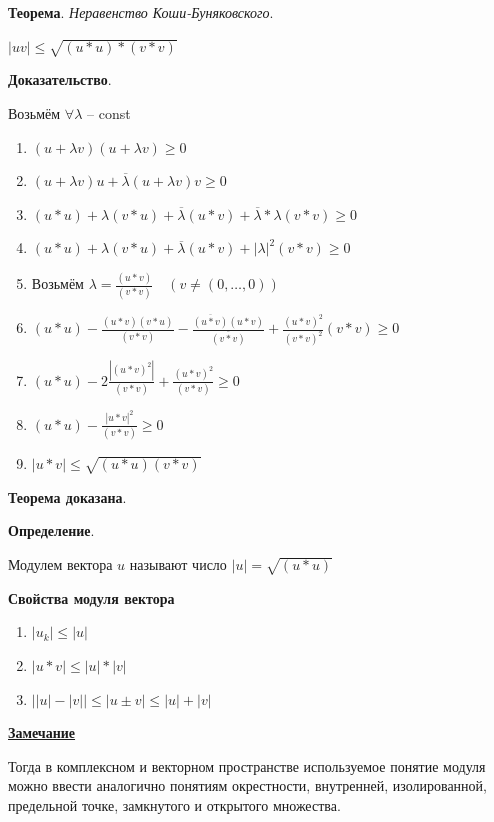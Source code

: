 \documentclass{article}
\newcommand{\parspace}{\vspace{10pt}}
\theoremstyle{break}
\begin{document}
\parspace

\textbf{Теорема}. \textit{Неравенство Коши-Буняковского}.

$|u v| \le \sqrt{(u * u) * (v * v)}$

\textbf{Доказательство}.

Возьмём $\forall \lambda $ -- const

\begin{enumerate}
    \item $(u + \lambda v) (u + \lambda v) \ge 0$
    \item $(u + \lambda v) u + \overline{\lambda} (u + \lambda v) v \ge 0$
    \item $(u * u) + \lambda (v * u) + \overline{\lambda} (u * v) + \overline{\lambda} * \lambda (v * v) \ge 0$
    \item $(u * u) + \lambda (v * u) + \overline{\lambda} (u * v) + |\lambda|^2 (v * v) \ge 0$
    \item Возьмём $\lambda = \frac{(u * v)}{(v * v)} \quad (v \neq (0, \dots, 0))$
    \item $(u * u) - \frac{(u * v) (v * u)}{(v * v)} - \frac{\overline{(u * v)} (u * v)}{\overline{(v * v)}}
    + \frac{(u * v)^2}{(v * v)^2} (v * v) \ge 0$
    \item $(u * u) - 2 \frac{|(u * v)^2|}{(v * v)} + \frac{(u * v)^2}{(v * v)} \ge 0$
    \item $(u * u) - \frac{|u * v|^2}{(v * v)} \ge 0$
    \item $|u * v| \le \sqrt{(u * u) (v * v)}$
\end{enumerate}

\textbf{Теорема доказана}.

\parspace

\textbf{Определение}.

Модулем вектора $u$ называют число $|u| = \sqrt{(u * u)}$

\parspace

\textbf{Свойства модуля вектора}

\begin{enumerate}
    \item $|u_k| \le |u|$
    \item $|u * v| \le |u| * |v|$
    \item $\big||u| - |v|\big| \le |u \pm v| \le |u| + |v|$
\end{enumerate}

\parspace

\underline{\textbf{Замечание}}

Тогда в комплексном и векторном пространстве используемое понятие модуля
можно ввести аналогично понятиям окрестности, внутренней, изолированной,
предельной точке, замкнутого и открытого множества.
\end{document}

